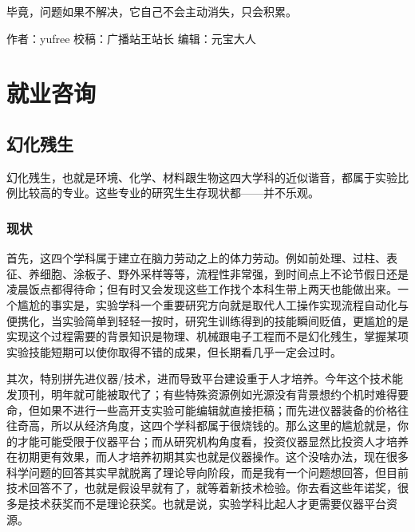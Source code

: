 \documentclass[]{book}
\begin{document}
毕竟，问题如果不解决，它自己不会主动消失，只会积累。

作者：yufree
校稿：广播站王站长
编辑：元宝大人

\hypertarget{ux5c31ux4e1aux54a8ux8be2}{%
\chapter{就业咨询}\label{ux5c31ux4e1aux54a8ux8be2}}

\hypertarget{ux5e7bux5316ux6b8bux751f}{%
\section{幻化残生}\label{ux5e7bux5316ux6b8bux751f}}

幻化残生，也就是环境、化学、材料跟生物这四大学科的近似谐音，都属于实验比例比较高的专业。这些专业的研究生生存现状都------并不乐观。

\hypertarget{ux73b0ux72b6}{%
\subsection{现状}\label{ux73b0ux72b6}}

首先，这四个学科属于建立在脑力劳动之上的体力劳动。例如前处理、过柱、表征、养细胞、涂板子、野外采样等等，流程性非常强，到时间点上不论节假日还是凌晨饭点都得待命；但有时又会发现这些工作找个本科生带上两天也能做出来。一个尴尬的事实是，实验学科一个重要研究方向就是取代人工操作实现流程自动化与便携化，当实验简单到轻轻一按时，研究生训练得到的技能瞬间贬值，更尴尬的是实现这个过程需要的背景知识是物理、机械跟电子工程而不是幻化残生，掌握某项实验技能短期可以使你取得不错的成果，但长期看几乎一定会过时。

其次，特别拼先进仪器/技术，进而导致平台建设重于人才培养。今年这个技术能发顶刊，明年就可能被取代了；有些特殊资源例如光源没有背景想约个机时难得要命，但如果不进行一些高开支实验可能编辑就直接拒稿；而先进仪器装备的价格往往奇高，所以从经济角度，这四个学科都属于很烧钱的。那么这里的尴尬就是，你的才能可能受限于仪器平台；而从研究机构角度看，投资仪器显然比投资人才培养在初期更有效果，而人才培养初期其实也就是仪器操作。这个没啥办法，现在很多科学问题的回答其实早就脱离了理论导向阶段，而是我有一个问题想回答，但目前技术回答不了，也就是假设早就有了，就等着新技术检验。你去看这些年诺奖，很多是技术获奖而不是理论获奖。也就是说，实验学科比起人才更需要仪器平台资源。
\end{document}
